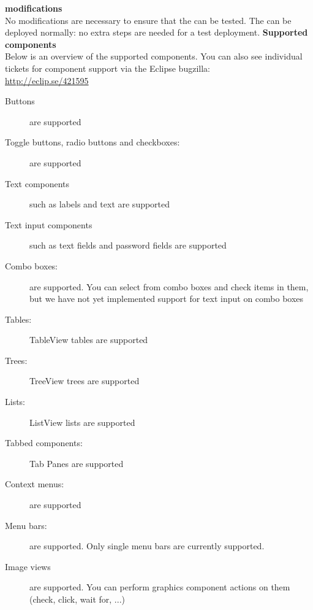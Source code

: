 \textbf{\gdaut{} modifications}\\
No modifications are necessary to ensure that the \gdaut{} can be tested. The \gdaut{} can be deployed normally: no extra steps are needed for a test deployment.
\textbf{Supported components}\\
Below is an overview of the supported components. You can also see individual tickets for component support via the Eclipse bugzilla:\\
\url{http://eclip.se/421595}
\begin{description}
\item [Buttons]{are supported}
\item [Toggle buttons, radio buttons and checkboxes:]{are supported}
\item [Text components]{such as labels and text are supported}
\item [Text input components]{such as text fields and password fields are supported}
\item [Combo boxes:]{are supported. You can select from combo boxes and check items in them, but we have not yet implemented support for text input on combo boxes}
\item [Tables:]{TableView tables are supported}
\item [Trees:]{TreeView trees are supported}
\item [Lists:]{ListView lists are supported}
\item [Tabbed components:]{Tab Panes are supported}
\item [Context menus:]{are supported}
\item [Menu bars:]{are supported. Only single menu bars are currently supported.}
\item [Image views]{are supported. You can perform graphics component actions on them (check, click, wait for, ...)}
\end{description}
